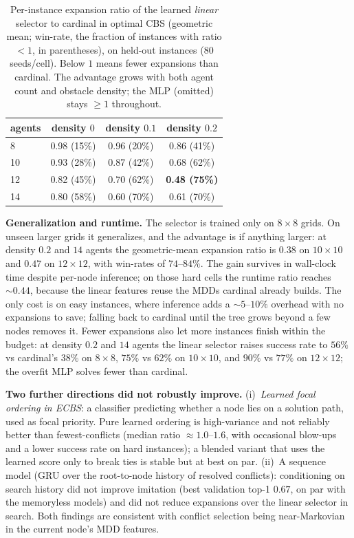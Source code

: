 \documentclass{article}
\theoremstyle{plain}
\theoremstyle{definition}
\theoremstyle{remark}
\newcommand{\seqFinding}{conditioning on search history did not improve imitation
(best validation top-1 $0.67$, on par with the memoryless models) and did not
reduce expansions over the linear selector in search.}
\begin{document}
\begin{table}[t]
\centering\small
\caption{Per-instance expansion ratio of the learned \emph{linear} selector to
cardinal in optimal CBS (geometric mean; win-rate, the fraction of instances with
ratio${<}1$, in parentheses), on held-out instances ($80$ seeds/cell). Below $1$
means fewer expansions than cardinal. The advantage grows with both agent count
and obstacle density; the MLP (omitted) stays ${\ge}1$ throughout.}
\label{tab:rq2}
\begin{tabular}{lccc}
\toprule
agents & density $0$ & density $0.1$ & density $0.2$ \\
\midrule
8  & 0.98 (15\%) & 0.96 (20\%) & 0.86 (41\%) \\
10 & 0.93 (28\%) & 0.87 (42\%) & 0.68 (62\%) \\
12 & 0.82 (45\%) & 0.70 (62\%) & \textbf{0.48 (75\%)} \\
14 & 0.80 (58\%) & 0.60 (70\%) & 0.61 (70\%) \\
\bottomrule
\end{tabular}
\end{table}

\textbf{Generalization and runtime.} The selector is trained only on $8\times8$
grids. On unseen larger grids it generalizes, and the advantage is if anything
larger: at density $0.2$ and $14$ agents the geometric-mean expansion ratio is
$0.38$ on $10\times10$ and $0.47$ on $12\times12$, with win-rates of $74$--$84\%$.
The gain survives in wall-clock time despite per-node inference; on those hard
cells the runtime ratio reaches $\sim\!0.44$, because the linear features reuse
the MDDs cardinal already builds. The only cost is on easy instances, where
inference adds a $\sim\!5$--$10\%$ overhead with no expansions to save; falling
back to cardinal until the tree grows beyond a few nodes removes it. Fewer
expansions also let more instances finish within the budget: at density $0.2$
and $14$ agents the linear selector raises success rate to $56\%$ vs cardinal's
$38\%$ on $8\times8$, $75\%$ vs $62\%$ on $10\times10$, and $90\%$ vs $77\%$ on
$12\times12$; the overfit MLP solves fewer than cardinal.

\textbf{Two further directions did not robustly improve.} (i)~\emph{Learned
focal ordering in ECBS}: a classifier predicting whether a node lies on a
solution path, used as focal priority. Pure learned ordering is high-variance and
not reliably better than fewest-conflicts (median ratio $\approx1.0$--$1.6$, with
occasional blow-ups and a lower success rate on hard instances); a blended
variant that uses the learned score only to break ties is stable but at best on
par. (ii)~A sequence model (GRU over the root-to-node history of resolved
conflicts): \seqFinding{} Both findings are consistent with conflict selection
being near-Markovian in the current node's MDD features.
\end{document}
